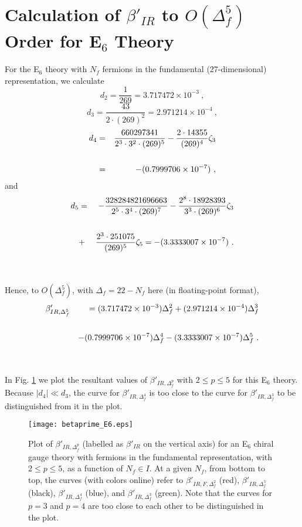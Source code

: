 \documentclass[prd,twocolumn,nofootinbib,amsfonts,amssymb]{revtex4}
\newcommand{\beq}{\begin{equation}}
\newcommand{\eeq}{\end{equation}}
\newcommand{\beqs}{\begin{eqnarray}}
\newcommand{\eeqs}{\end{eqnarray}}
\begin{document}

\section{Calculation of $\beta'_{IR}$ to $O(\Delta_f^5)$ Order for 
E$_6$ Theory} 
\label{betaprime_e6_section}

For the E$_6$ theory with $N_f$ fermions in the fundamental (27-dimensional)
representation, we calculate 
%
\beq
d_2 = \frac{1}{269} = 3.717472 \times 10^{-3} \ , 
\label{d2_e6}
\eeq
%
%
\beq
d_3 = \frac{43}{2 \cdot (269)^2} = 2.971214 \times 10^{-4}  \ , 
\label{d3_e6}
\eeq
%
%
\beqs
d_4 &=& \frac{660297341}{2^3 \cdot 3^2 \cdot (269)^5} 
-\frac{2 \cdot 14355}{(269)^4}\zeta_3 \cr\cr
    &=& -(0.7999706 \times 10^{-7})  \ , 
\label{d4_e6}
\eeqs
%
and
%
\beqs
d_5 &=& -\frac{328284821696663}{2^5 \cdot 3^4 \cdot (269)^7} 
-\frac{2^8 \cdot 18928393}{3^3 \cdot (269)^6}\zeta_3 \cr\cr
&+&\frac{2^3 \cdot 251075}{(269)^5}\zeta_5 = -(3.3333007 \times 10^{-7}) \ . 
\cr\cr
&&
\label{d5_e6}
\eeqs
%
Hence, to $O(\Delta_f^5)$, with $\Delta_f=22-N_f$ here 
(in floating-point format), 
\beqs
\beta'_{IR,\Delta_f^5} &&= (3.717472 \times 10^{-3})\Delta_f^2 + 
(2.971214 \times 10^{-4})\Delta_f^3 \cr\cr
&&-(0.7999706 \times 10^{-7}) \Delta_f^4 
-(3.3333007 \times 10^{-7}) \Delta_f^5 \ . \cr\cr
&&
\label{betaprime_e6_fund}
\eeqs
%
In Fig. \ref{betaprime_E6_plot} we plot the
resultant values of $\beta'_{IR,\Delta_f^p}$ with $2 \le p \le 5$ for this
E$_6$ theory.  Because $|d_4| \ll d_3$, the curve for $\beta'_{IR,\Delta_f^4}$ 
is too close to the curve for $\beta'_{IR,\Delta_f^3}$ to be distinguished from
it in the plot. 


\begin{figure}
  \begin{center}
    \texttt{[image: betaprime\_E6.eps]}
  \end{center}
  \caption{Plot of $\beta'_{IR,\Delta_f^p}$ (labelled as
    $\beta'_{IR}$ on the vertical axis) for an E$_6$ chiral gauge theory
    with fermions in the fundamental representation, with $2 \le p \le 5$, 
    as a function of $N_f \in I$. At a given $N_f$, from bottom to top, the 
    curves (with colors online) refer to $\beta'_{IR,F,\Delta_f^2}$ (red),
    $\beta'_{IR,\Delta_f^5}$ (black), $\beta'_{IR,\Delta_f^4}$ (blue), and
    $\beta'_{IR,\Delta_f^3}$ (green).  Note that the curves for $p=3$ and
    $p=4$ are too close to each other to be distinguished in the plot.}
\label{betaprime_E6_plot}
\end{figure} 
\end{document}
